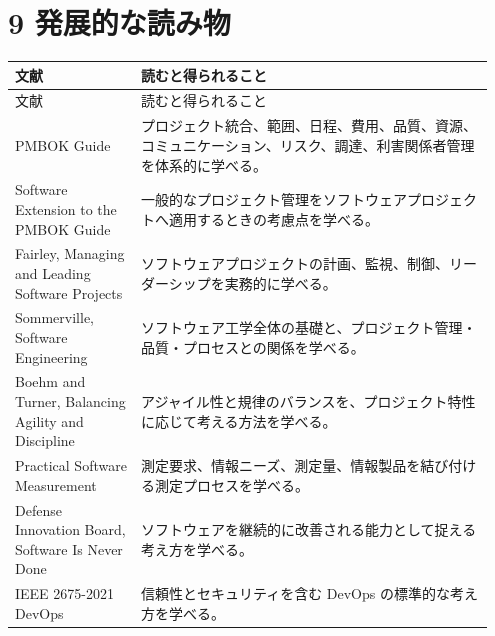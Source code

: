 \documentclass[a4paper,11pt]{ltjsarticle}
\begin{document}
\section{9 発展的な読み物}
\begin{longtable}{>{\raggedright\arraybackslash}p{0.25\linewidth}>{\raggedright\arraybackslash}p{0.70\linewidth}}
\toprule
文献 & 読むと得られること \\
\midrule
\endfirsthead
\toprule
文献 & 読むと得られること \\
\midrule
\endhead
PMBOK Guide & プロジェクト統合、範囲、日程、費用、品質、資源、コミュニケーション、リスク、調達、利害関係者管理を体系的に学べる。 \\
Software Extension to the PMBOK Guide & 一般的なプロジェクト管理をソフトウェアプロジェクトへ適用するときの考慮点を学べる。 \\
Fairley, Managing and Leading Software Projects & ソフトウェアプロジェクトの計画、監視、制御、リーダーシップを実務的に学べる。 \\
Sommerville, Software Engineering & ソフトウェア工学全体の基礎と、プロジェクト管理・品質・プロセスとの関係を学べる。 \\
Boehm and Turner, Balancing Agility and Discipline & アジャイル性と規律のバランスを、プロジェクト特性に応じて考える方法を学べる。 \\
Practical Software Measurement & 測定要求、情報ニーズ、測定量、情報製品を結び付ける測定プロセスを学べる。 \\
Defense Innovation Board, Software Is Never Done & ソフトウェアを継続的に改善される能力として捉える考え方を学べる。 \\
IEEE 2675-2021 DevOps & 信頼性とセキュリティを含む DevOps の標準的な考え方を学べる。 \\
\bottomrule
\end{longtable}
\end{document}
